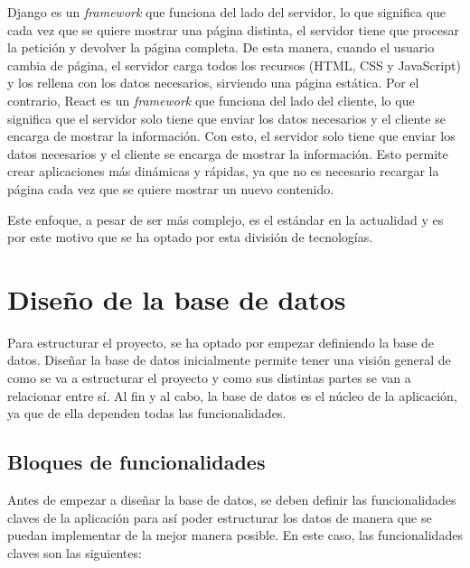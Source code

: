 Django es un \textit{framework} que funciona del lado del servidor, lo que significa que cada vez que se quiere mostrar una página distinta, el servidor tiene que procesar la petición y devolver la página completa. De esta manera, cuando el usuario cambia de página, el servidor carga todos los recursos (HTML, CSS y JavaScript) y los rellena con los datos necesarios, sirviendo una página estática. Por el contrario, React es un \textit{framework} que funciona del lado del cliente, lo que significa que el servidor solo tiene que enviar los datos necesarios y el cliente se encarga de mostrar la información. Con esto, el servidor solo tiene que enviar los datos necesarios y el cliente se encarga de mostrar la información. Esto permite crear aplicaciones más dinámicas y rápidas, ya que no es necesario recargar la página cada vez que se quiere mostrar un nuevo contenido.

Este enfoque, a pesar de ser más complejo, es el estándar en la actualidad y es por este motivo que se ha optado por esta división de tecnologías.

\section{Diseño de la base de datos}
\label{sec:diseno_base_datos}

Para estructurar el proyecto, se ha optado por empezar definiendo la base de datos. Diseñar la base de datos inicialmente permite tener una visión general de como se va a estructurar el proyecto y como sus distintas partes se van a relacionar entre sí. Al fin y al cabo, la base de datos es el núcleo de la aplicación, ya que de ella dependen todas las funcionalidades.

\subsection{Bloques de funcionalidades}

Antes de empezar a diseñar la base de datos, se deben definir las funcionalidades claves de la aplicación para así poder estructurar los datos de manera que se puedan implementar de la mejor manera posible. En este caso, las funcionalidades claves son las siguientes:

